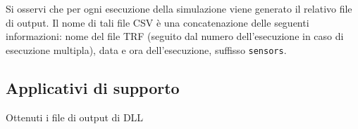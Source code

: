 Si osservi che per ogni esecuzione della simulazione viene generato il relativo file di output. Il nome di tali file \acs{CSV} è una concatenazione delle seguenti informazioni: nome del file \acs{TRF} (seguito dal numero dell'esecuzione in caso di esecuzione multipla), data e ora dell'esecuzione, suffisso \lstinline[]|sensors|.

\subsection{Applicativi di supporto}
Ottenuti i file di output di  \acs{DLL} \omissis{}


